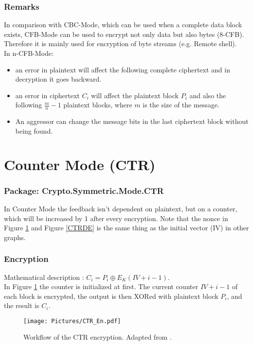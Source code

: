 \subsubsection*{Remarks}
In comparison with CBC-Mode, which can be used when a complete data block exists, CFB-Mode can be used to encrypt not only data but also bytes (8-CFB). Therefore it is mainly used for encryption of byte streams (e.g. Remote shell).\\
In n-CFB-Mode:
\begin{itemize}
\item an error in plaintext will affect the following complete ciphertext and in decryption it goes backward.
\item an error in ciphertext $C_i$ will affect the plaintext block $P_i$ and also the following $\frac{m}{n}-1$ plaintext blocks, where $m$ is the size of the message.
\item An aggressor can change the message bits in the last ciphertext block without being found.
\end{itemize}
\section{Counter Mode (CTR)}\label{CounterMode}
\subsubsection*{Package: Crypto.Symmetric.Mode.CTR}
In Counter Mode the feedback isn't dependent on plaintext, but on a counter, which will be increased by 1 after every encryption. Note that the nonce in Figure \ref{CTREN} and Figure \ref{CTRDE} is the same thing as the initial vector (IV) in other graphs. 
\subsubsection*{Encryption}
Mathematical description : $C_i=P_i\oplus E_K(IV+i-1)$.\\
In Figure \ref{CTREN} the counter is initialized at first. The current counter $IV+i-1$ of each block is encrypted, the output is then XORed with plaintext block $P_i$, and the result is $C_i$.
\begin{figure}[h]
\centering
\texttt{[image: Pictures/CTR\_En.pdf]} 
\caption{Workflow of the CTR encryption. Adapted from \cite{DBLP:reference/crypt/2011}.}\label{CTREN}
\end{figure}
